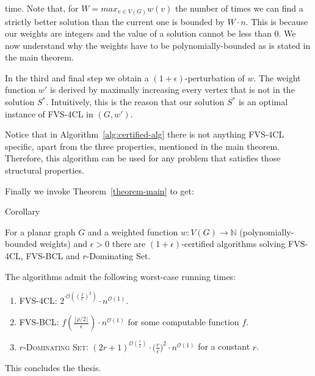 time. Note that, for $W = max_{v \in V(G)} w(v)$ the number of times we can find a strictly 
better solution than the current one is bounded by $W \cdot n$. This is because our weights 
are integers and the value of a solution cannot be less than 0. We now understand why 
the weights have to be polynomially-bounded as is stated in the main theorem. 

In the third and final step we obtain a $(1 + \epsilon)$-perturbation of $w$. The 
weight function $w'$ is derived by maximally increasing every vertex that is not in the 
solution $S^*$. Intuitively, this is the reason that our solution $S^*$ is an optimal 
instance of FVS-4CL in $(G, w')$.

Notice that in Algorithm~\ref{alg:certified-alg} there is not anything FVS-4CL specific, 
apart from the three properties, mentioned in the main theorem. 
Therefore, this algorithm can be used for any problem that satisfies 
those structural properties.

Finally we invoke Theorem~\ref{theorem-main} to get:

\begin{mydefinition}{Corollary}
    \label{corollary-final}

    For a planar graph $G$ and a weighted function 
    $w : V(G) \to \mathbb{N}$ (polynomially-bounded weights) and 
    $\epsilon > 0$ there are $(1 + \epsilon)$-certified algorithms solving FVS-4CL, FVS-BCL and 
    $r$-Dominating Set.

\end{mydefinition}

The algorithms admit the following worst-case running times:

\begin{enumerate}
    \item \textsc{FVS-4CL}: $2^{\cdot\mathcal{O}((\frac{2}{\epsilon})^2)} \cdot n^{\mathcal{O}(1)}$.
    \item \textsc{FVS-BCL}: $f(\frac{\lfloor\rho/2\rfloor}{\epsilon}) \cdot n^{\mathcal{O}(1)}$ for some computable function $f$.
    \item \textsc{$r$-Dominating Set}: $(2r + 1)^{\mathcal{O}(\frac{r}{\epsilon})} \cdot 
    \bigl(\frac{r}{\epsilon}\bigr)^2 \cdot n^{\mathcal{O}(1)}$ for a constant $r$.
\end{enumerate}

This concludes the thesis.